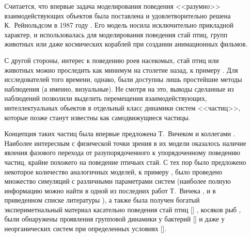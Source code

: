 
Считается, что впервые задача моделирования поведения <<разумно>> взаимодействующих объектов была поставлена и удовлетворительно решена К.~Рейнольдсом в 1987 году \cite{reynolds1987}. Его модель носила исключительно прикладной характер, и использовалась для моделирования поведения стай птиц, групп животных или даже космических кораблей при создании анимационных фильмов.

С другой стороны, интерес к поведению роев насекомых, стай птиц или животных можно проследить как минимум на столетие назад, к примеру \cite{selous1931}. Для исследователей того времени, однако, были доступны лишь простейшие методы наблюдения (а именно, визуальные). Не смотря на это, выводы сделанные из наблюдений позволили выделить перемещения взаимодействующих, интеллектуальных обьектов в отдельный класс динамики систем <<частиц>>, которые позже станут известны как самодвижущиеся частицы.%

Концепция таких частиц была впервые предложена Т.~Вичеком и коллегами \cite{vicsek1995}. Наиболее интересным с физической точки зрения в их модели оказалось наличие явления фазового перехода от разупорядоченного к упорядоченному поведению частиц, крайне похожего на поведение птичьих стай.
С тех пор было предложено некоторое количество аналогичных моделей, к примеру \cite{gregoire2004,schubring2013,kuemmel2013,huepe2008,chate2008,tu2000}, было проведено множество симуляций с различными параметрами систем (наиболее полную информацию можно найти в одной из последних работ Т.~Вичека \cite{vicsek2012}, и в приведенном списке литературы %
), а также была получен богатый экспериметнальный материал касательно поведения стай птиц [] %
, косяков рыб \cite{cambui2012}, были обнаружены проявления групповой динамики у бактерий [] и даже у неорганических систем при определенных условиях [].